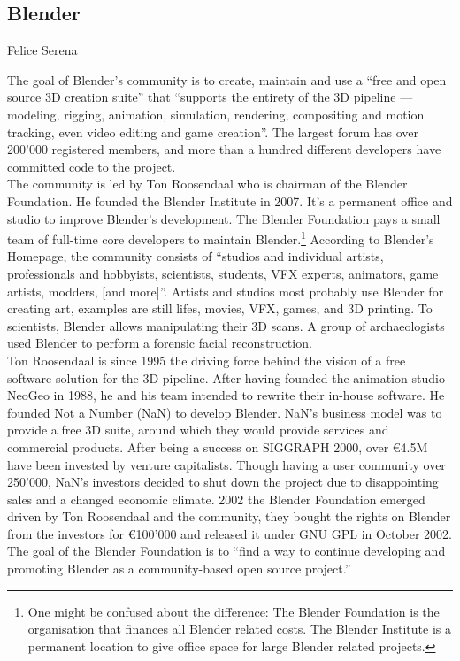 \subsection{Blender}{Felice Serena}

The goal of Blender's community is to create, maintain and use a ``free and open source 3D creation suite'' that ``supports the entirety of the 3D pipeline — modeling, rigging, animation, simulation, rendering, compositing and motion tracking, even video editing and game creation''. 
The largest forum\cite{blender-forum} has over 200'000 registered members, and more than a hundred different developers have committed code to the project. \\

The community is led by Ton Roosendaal who is chairman of the Blender Foundation. 
He founded the Blender Institute in 2007. 
It's a permanent office and studio to improve Blender's development.\cite{blender-foundation-history}
The Blender Foundation pays a small team of full-time core developers to maintain Blender.\cite{blender-development-support}\footnote{
One might be confused about the difference: The Blender Foundation is the organisation that finances all Blender related costs. 
The Blender Institute is a permanent location to give office space for large Blender related projects.
}
According to Blender's Homepage\cite{blender-homepage}, the community consists of ``studios and individual artists, professionals and hobbyists, scientists, students, VFX experts, animators, game artists, modders, [and more]''.
Artists and studios most probably use Blender for creating art, examples are still lifes, movies, VFX, games, and 3D printing.
To scientists, Blender allows manipulating their 3D scans. 
A group of archaeologists used Blender to perform a forensic facial reconstruction.\cite{blender-facial-reconstruction} \\

Ton Roosendaal is since 1995 the driving force behind the vision of a free software solution for the 3D pipeline. 
After having founded the animation studio NeoGeo in 1988\cite{blender-manual-history}, he and his team intended to rewrite their in-house software. 
He founded Not a Number (NaN) to develop Blender. 
NaN's business model was to provide a free 3D suite, around which they would provide services and commercial products. 
After being a success on SIGGRAPH 2000, over €4.5M have been invested by venture capitalists. 
Though having a user community over 250'000, NaN's investors decided to shut down the project due to disappointing sales and a changed economic climate. 
2002 the Blender Foundation emerged driven by Ton Roosendaal and the community, they bought the rights on Blender from the investors for €100'000 and released it under GNU GPL\cite{blender-license} in October 2002. 
The goal of the Blender Foundation is to ``find a way to continue developing and promoting Blender as a community-based open source project.'' \cite{blender-foundation-history} \\

